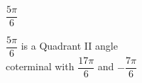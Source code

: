 {$\dfrac{5\pi}{6}$}
{$\dfrac{5\pi}{6}$ is a Quadrant II angle\\
coterminal with $\dfrac{17\pi}{6}$ and $-\dfrac{7\pi}{6}$

\begin{center}
\end{center}}